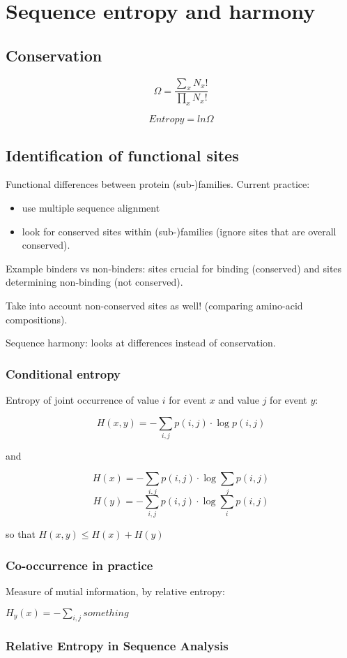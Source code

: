 \chapter{Sequence entropy and harmony}

\section{Conservation}


$$
\Omega = \frac{\sum_{x}{N_{x}}!}{\prod_{x}{N_{x}!}}
$$

$$
Entropy = ln{\Omega}
$$

\section{Identification of functional sites}

Functional differences between protein (sub-)families. Current practice:
\begin{itemize}
\item use multiple sequence alignment
\item look for conserved sites within (sub-)families (ignore sites that are 
overall conserved).
\end{itemize}

Example binders vs non-binders: sites crucial for binding (conserved) and sites 
determining non-binding (not conserved).

Take into account non-conserved sites as well! (comparing amino-acid 
compositions).

Sequence harmony: looks at differences instead of conservation.


\subsection{Conditional entropy}

Entropy of joint occurrence of value $i$ for event $x$ and value $j$ for event 
$y$:

$$
H(x,y) = - \sum_{i,j}{p(i,j) \cdot \log p(i,j)}
$$

and

$$
H(x) = - \sum_{i,j}{p(i,j) \cdot \log{\sum_{j}{p(i,j)}}}
$$
$$
H(y) = - \sum_{i,j}{p(i,j) \cdot \log{\sum_{i}{p(i,j)}}}
$$

so that $H(x,y) \leq H(x) + H(y)$

\subsection{Co-occurrence in practice}

Measure of mutial information, by relative entropy:

$H_{y}(x) = - \sum_{i,j}{something}$

\subsection{Relative Entropy in Sequence Analysis}

